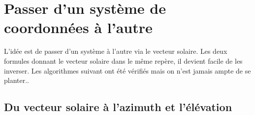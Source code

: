 \documentclass[letterpaper,10pt,english]{sphinxmanual}
\begin{document}
\section{Passer d’un système de coordonnées à l’autre}
\label{\detokenize{Part3/EmplacementSoleil:passer-d-un-systeme-de-coordonnees-a-l-autre}}
L’idée est de passer d’un système à l’autre via le vecteur solaire. Les deux formules donnant le vecteur solaire dans le même repère, il devient facile de les inverser. Les algorithmes suivant ont été vérifiés mais on n’est jamais ampte de se planter..


\subsection{Du vecteur solaire à l’azimuth et l’élévation}
\label{\detokenize{Part3/EmplacementSoleil:du-vecteur-solaire-a-l-azimuth-et-l-elevation}}
\begin{sphinxVerbatim}[commandchars=\\\{\}]
     
 
      
        
     
           
              
                  
            
     
\end{sphinxVerbatim}
\end{document}
